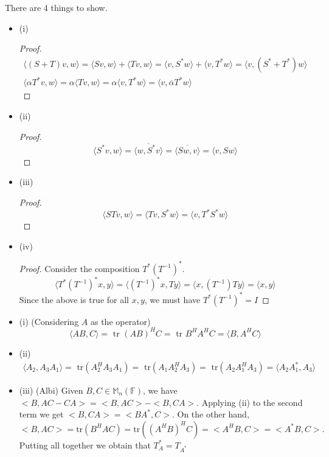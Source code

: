 \documentclass[12pt]{article}
\newenvironment{problem}[2][Problem]{\begin{trivlist}
\item[\hskip \labelsep {\bfseries #1}\hskip \labelsep {\bfseries #2.}]}{\end{trivlist}}
\theoremstyle{definition}
\theoremstyle{definition}
\theoremstyle{definition}
\theoremstyle{definition}
\begin{document}
\begin{problem}{3.39}
There are 4 things to show.
\begin{itemize}
\item (i)
\begin{proof}
\begin{align*}
\langle (S+T) v, w \rangle = \langle Sv, w \rangle + \langle Tv, w \rangle = \langle v, S^*w \rangle + \langle v, T^*w \rangle = \langle v, (S^* + T^*)w \rangle \\
\langle \alpha T^*v, w \rangle = \alpha \langle Tv, w \rangle= \alpha \langle v, T^*w \rangle = \langle v, \overline{\alpha}T^*w \rangle
\end{align*}
\end{proof}
\item (ii)
\begin{proof}
$$ \langle S^*v, w \rangle = \overline{\langle w, S^*v \rangle} = \overline{\langle Sw, v \rangle} = \langle v, Sw \rangle $$
\end{proof}
\item (iii)
\begin{proof}
$$\langle STv, w \rangle = \langle Tv, S^*w \rangle = \langle v, T^*S^*w \rangle$$
\end{proof}
\item (iv)
\begin{proof}
Consider the composition $T^*(T^{-1})^*$. 
$$
\langle 
T^*(T^{-1})^*x, y \rangle = \langle (T^{-1})^*x, Ty \rangle= \langle x, (T^{-1})Ty \rangle = \langle x, y \rangle
$$
Since the above is true for all $x, y$, we must have $T^*(T^{-1})^* = I $ 
\end{proof}
\end{itemize}
\end{problem}

\begin{problem}{3.40}
\end{problem}
\begin{itemize}
\item (i) (Considering $A$ as the operator)
$$
\langle AB, C \rangle = \text{ tr }(AB)^HC = \text{ tr } B^HA^HC = \langle B, A^HC \rangle
$$
\item (ii) 
\begin{align*}
\langle A_2, A_3A_1 \rangle = \text{ tr}(A_2^HA_3A_1) = \text{ tr}(A_1A_2^HA_3) = \text{ tr}(A_2A_1^HA_3) = \langle A_2A_1^*, A_3 \rangle
\end{align*}
\item (iii) (Albi)
Given $B,C\in\mathbb M_n(\mathbb F)$, we have $<B,AC-CA>=<B,AC>-<B,CA>$. 
Applying (ii) to the second term we get $<B,CA>=<BA^*,C>$.
On the other hand, 
\begin{equation*}
    <B,AC>=\text{tr}(B^HAC)=\text{tr}((A^HB)^HC)=<A^HB,C>=<A^*B,C>.
\end{equation*}
Putting all together we obtain that $T_A^*=T_{A^*}$
\end{itemize}
\end{document}
